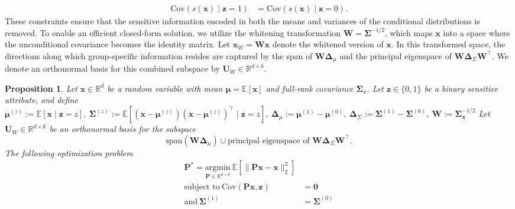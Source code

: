 \documentclass[ecta,nameyear,final]{econsocart}
\numberwithin{equation}{section}
\theoremstyle{plain}
\newtheorem{proposition}{Proposition}
\theoremstyle{definition}
\begin{document}
\begin{multicols}{2}
\begin{align*}
    \text{Cov}(s(\mathbf{x}) \mid \mathbf{z}=1) &= \text{Cov}(s(\mathbf{x}) \mid \mathbf{z}=0).
\end{align*}
These constraints ensure that the sensitive information encoded in both the means and variances of the conditional distributions is removed. 
\newline \newline
To enable an efficient closed-form solution, we utilize the whitening transformation $\mathbf{W} = \boldsymbol{\Sigma}^{-1/2}$, which maps $\mathbf{x}$ into a space where the unconditional covariance becomes the identity matrix.
\newline \newline
Let $\mathbf{x}_W = \mathbf{W}\mathbf{x}$ denote the whitened version of $\mathbf{x}$. In this transformed space, the directions along which group-specific information resides are captured by the span of $\mathbf{W}\boldsymbol{\Delta}_\mu$ and the principal eigenspace of $\mathbf{W} \boldsymbol{\Delta}_{\Sigma} \mathbf{W}^\top$. 
\newline \newline
We denote an orthonormal basis for this combined subspace by $\mathbf{U}_W \in \mathbb{R}^{d \times k}$.
\newline \newline
\begin{proposition}
    Let $\mathbf{x} \in \mathbb{R}^d$ be a random variable with mean  $\boldsymbol{\mu} = \mathbb{E}[\mathbf{x}]$ and full-rank covariance $\boldsymbol{\Sigma}_{x}$. Let $\mathbf{z} \in \{0, 1\}$ be a binary sensitive attribute, and define
    $\boldsymbol{\mu}^{(z)} := \mathbb{E}[\mathbf{x} \mid \mathbf{z} = z], \ 
    \boldsymbol{\Sigma}^{(z)} := \mathbb{E}\left[(\mathbf{x} - \boldsymbol{\mu}^{(z)})(\mathbf{x} - \boldsymbol{\mu}^{(z)})^\top \mid \mathbf{z} = z\right],\
    \boldsymbol{\Delta}_{\mu} := \boldsymbol{\mu}^{(1)} - \boldsymbol{\mu}^{(0)},\
    \boldsymbol{\Delta}_{\Sigma} := \boldsymbol{\Sigma}^{(1)} - \boldsymbol{\Sigma}^{(0)}, \
    \mathbf{W} := \boldsymbol{\Sigma}_\mathbf{x}^{-1/2}$
    Let $\mathbf{U}_W \in \mathbb{R}^{d \times k}$ be an orthonormal basis for the subspace
    $$
    \text{span}(\mathbf{W} \boldsymbol{\Delta}_{\mu}) \cup \text{principal eigenspace of } \mathbf{W} \boldsymbol{\Delta}_{\Sigma} \mathbf{W}^\top.
    $$
    The following optimization problem 
    \begin{align*}
        \mathbf{P}^{*} =  \underset{\mathbf{P} \in \mathbb{R}^{d \times d}}{\text{argmin}} \  \mathbb{E}\left[ \| \mathbf{P}\mathbf{x} - \mathbf{x} \|^2_{2} \right] \\ \text{subject to} \ \text{Cov}(\mathbf{P}\mathbf{x}, \mathbf{z}) &= \mathbf{0} \\ \text{and} \ \boldsymbol{\Sigma}^{(1)} &= \boldsymbol{\Sigma}^{(0)}

\end{align*}
\end{proposition}
\end{multicols}
\end{document}
